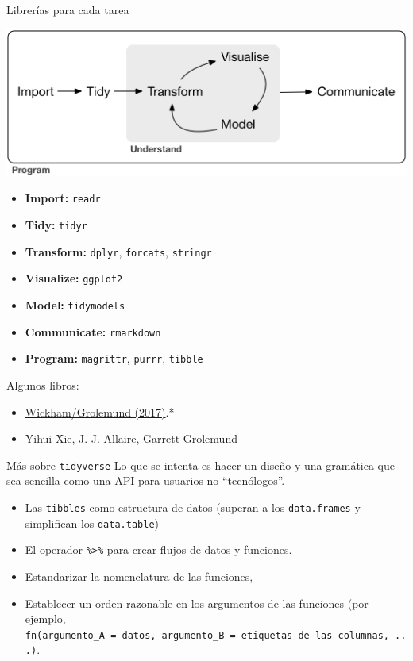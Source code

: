 \documentclass[
  ignorenonframetext,
  aspectratio=169]{beamer}
\providecommand{\tightlist}{%
  \setlength{\itemsep}{0pt}\setlength{\parskip}{0pt}}
\begin{document}
\begin{frame}[fragile]{Librerías para cada tarea}
\protect\hypertarget{libreruxedas-para-cada-tarea}{}
\begin{center}\includegraphics[width=0.3\linewidth]{Imgs/data-science} \end{center}

\begin{itemize}
\tightlist
\item
  \textbf{Import:} \texttt{readr}\\
\item
  \textbf{Tidy:} \texttt{tidyr}\\
\item
  \textbf{Transform:} \texttt{dplyr}, \texttt{forcats},
  \texttt{stringr}\\
\item
  \textbf{Visualize:} \texttt{ggplot2}\\
\item
  \textbf{Model:} \texttt{tidymodels}\\
\item
  \textbf{Communicate:} \texttt{rmarkdown}\\
\item
  \textbf{Program:} \texttt{magrittr}, \texttt{purrr}, \texttt{tibble}
\end{itemize}

Algunos libros:

\begin{itemize}
\tightlist
\item
  \href{https://r4ds.had.co.nz/tidy-data.html}{Wickham/Grolemund
  (2017)}.*
\item
  \href{https://bookdown.org/yihui/rmarkdown/}{Yihui Xie, J. J. Allaire,
  Garrett Grolemund}
\end{itemize}
\end{frame}

\begin{frame}[fragile]{Más sobre \texttt{tidyverse}}
\protect\hypertarget{muxe1s-sobre-tidyverse-1}{}
Lo que se intenta es hacer un diseño y una gramática que sea sencilla
como una API para usuarios no ``tecnólogos''.

\begin{itemize}
\item
  Las \texttt{tibbles} como estructura de datos (superan a los
  \texttt{data.frames} y simplifican los \texttt{data.table})
\item
  El operador \texttt{\%\textgreater{}\%} para crear flujos de datos y
  funciones.
\item
  Estandarizar la nomenclatura de las funciones,
\item
  Establecer un orden razonable en los argumentos de las funciones (por
  ejemplo,
  \texttt{fn(argumento\_A\ =\ datos,\ argumento\_B\ =\ etiquetas\ de\ las\ columnas,\ ...)}.
\end{itemize}
\end{frame}
\end{document}
